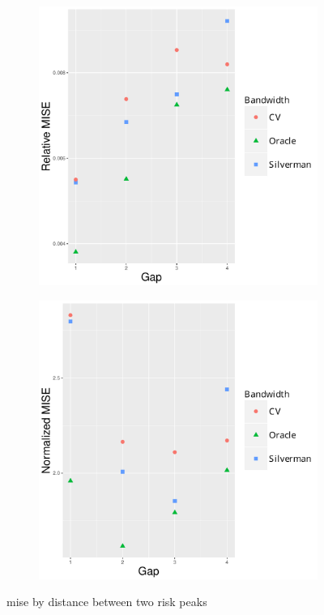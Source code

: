 \begin{figure}[htbp]
\begin{subfigure}[b]{0.24\textwidth}
        \includegraphics[width=\textwidth]{results/by_two_peaks/RMISE-vs-risk-peak-gap}
        \caption{}
    \end{subfigure}
    \begin{subfigure}[b]{0.24\textwidth}
        \includegraphics[width=\textwidth]{results/by_two_peaks/NMISE-vs-risk-peak-gap}
        \caption{}
    \end{subfigure}
    \caption{\gls{mise} by distance between two risk peaks}
    \label{fig:ise:p1.4_100_G}
\end{figure}

